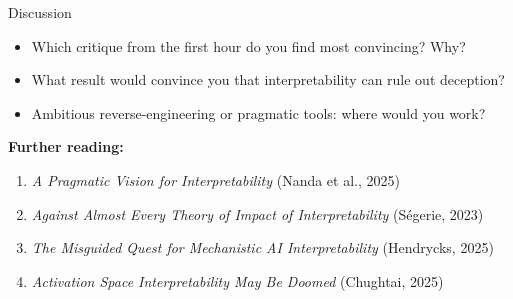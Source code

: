 \begin{frame}{Discussion}
\begin{itemize}
\setlength{\itemsep}{0.8em}
\item Which critique from the first hour do you find most convincing? Why?
\item What result would convince you that interpretability can rule out deception?
\item Ambitious reverse-engineering or pragmatic tools: where would you work?
\end{itemize}

\vspace{1.5em}
{\small\textbf{Further reading:}}
\begin{enumerate}
\small
\item \emph{A Pragmatic Vision for Interpretability} (Nanda et al., 2025)
\item \emph{Against Almost Every Theory of Impact of Interpretability} (Ségerie, 2023)
\item \emph{The Misguided Quest for Mechanistic AI Interpretability} (Hendrycks, 2025)
\item \emph{Activation Space Interpretability May Be Doomed} (Chughtai, 2025)
\end{enumerate}

\end{frame}
